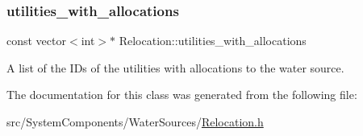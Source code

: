 \subsubsection{\texorpdfstring{utilities\+\_\+with\+\_\+allocations}{utilities\_with\_allocations}}
{\footnotesize\ttfamily const vector$<$int$>$$\ast$ Relocation\+::utilities\+\_\+with\+\_\+allocations}



A list of the I\+Ds of the utilities with allocations to the water source. 



The documentation for this class was generated from the following file\+:\begin{DoxyCompactItemize}
\item 
src/\+System\+Components/\+Water\+Sources/\mbox{\hyperlink{Relocation_8h}{Relocation.\+h}}\end{DoxyCompactItemize}
